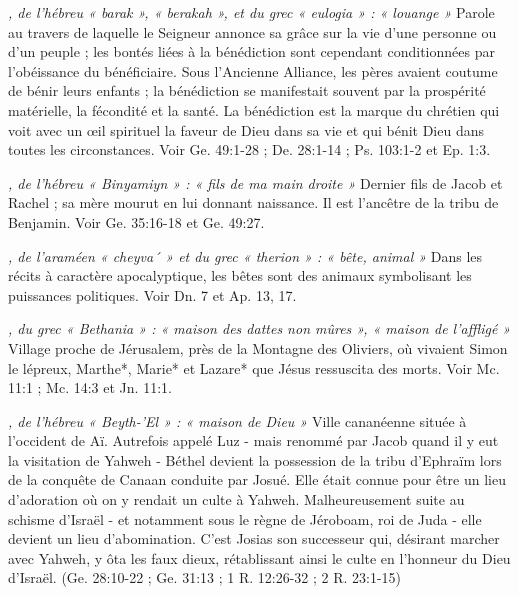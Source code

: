 \begin{multicols}{2}
{\textit{, de l'hébreu « barak », « berakah », et du grec « eulogia » : « louange »}\newline
Parole au travers de laquelle le Seigneur annonce sa grâce sur la vie d'une personne ou d'un peuple ; les bontés liées à la bénédiction sont cependant conditionnées par l'obéissance du bénéficiaire. Sous l'Ancienne Alliance, les pères avaient coutume de bénir leurs enfants ; la bénédiction se manifestait souvent par la prospérité matérielle, la fécondité et la santé. La bénédiction est la marque du chrétien qui voit avec un œil spirituel la faveur de Dieu dans sa vie et qui bénit Dieu dans toutes les circonstances. Voir Ge. 49:1-28 ; De. 28:1-14 ; Ps. 103:1-2 et Ep. 1:3.

\textit{, de l'hébreu « Binyamiyn » : « fils de ma main droite »}\newline
Dernier fils de Jacob et Rachel ; sa mère mourut en lui donnant naissance. Il est l'ancêtre de la tribu de Benjamin. Voir Ge. 35:16-18 et Ge. 49:27.

\textit{, de l'araméen « cheyva´ » et du grec « therion » : « bête, animal »}\newline
Dans les récits à caractère apocalyptique, les bêtes sont des animaux symbolisant les puissances politiques. Voir Dn. 7 et Ap. 13, 17.

\textit{, du grec « Bethania » : « maison des dattes non mûres », « maison de l'affligé »}\newline
Village proche de Jérusalem, près de la Montagne des Oliviers, où vivaient Simon le lépreux, Marthe*, Marie* et Lazare* que Jésus ressuscita des morts. Voir Mc. 11:1 ; Mc. 14:3 et Jn. 11:1.

\textit{, de l'hébreu « Beyth-'El » : « maison de Dieu »}\newline
Ville cananéenne située à l'occident de Aï. Autrefois appelé Luz - mais renommé par Jacob quand il y eut la visitation de Yahweh - Béthel devient la possession de la tribu d'Ephraïm lors de la conquête de Canaan conduite par Josué. Elle était connue pour être un lieu d'adoration où on y rendait un culte à Yahweh. Malheureusement suite au schisme d'Israël - et notamment sous le règne de Jéroboam, roi de Juda - elle devient un lieu d'abomination. C'est Josias son successeur qui, désirant marcher avec Yahweh, y ôta les faux dieux, rétablissant ainsi le culte en l'honneur du Dieu d'Israël. (Ge. 28:10-22 ; Ge. 31:13 ; 1 R. 12:26-32 ; 2 R. 23:1-15)

}
\end{multicols}
